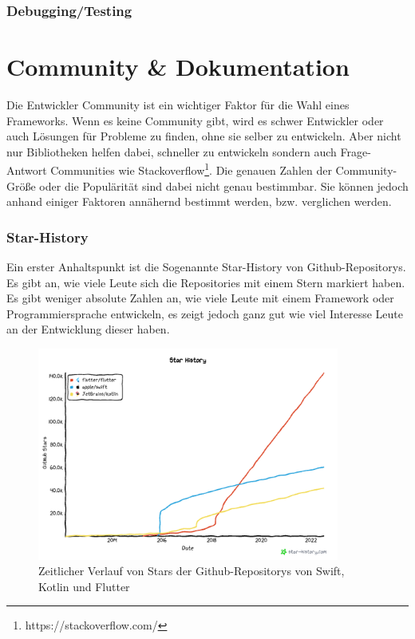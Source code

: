 \subsubsection{Debugging/Testing}

\section{Community \& Dokumentation}
Die Entwickler Community ist ein wichtiger Faktor für die Wahl eines Frameworks. Wenn es keine Community gibt, wird es schwer Entwickler oder auch Lösungen für Probleme zu finden, ohne sie selber zu entwickeln. Aber nicht nur Bibliotheken helfen dabei, schneller zu entwickeln sondern auch Frage-Antwort Communities wie Stackoverflow\footnote{https://stackoverflow.com/}.  Die genauen Zahlen der Community-Größe oder die Populärität sind dabei nicht genau bestimmbar. Sie können jedoch anhand einiger Faktoren annähernd bestimmt werden, bzw. verglichen werden.

\subsubsection{Star-History}
Ein erster Anhaltspunkt ist die Sogenannte Star-History von Github-Repositorys. Es gibt an, wie viele Leute sich die Repositories mit einem Stern markiert haben. Es gibt weniger absolute Zahlen an, wie viele Leute mit einem Framework oder Programmiersprache entwickeln, es zeigt jedoch ganz gut wie viel Interesse Leute an der Entwicklung dieser haben.
\begin{figure}[ht]
  \centering
  \includegraphics[height=7cm,keepaspectratio]{images/star-history_programming languages.png} 
  \caption[Zeitlicher Verlauf von Stars der Github-Repositorys von Swift, Kotlin und Flutter]{Zeitlicher Verlauf von Stars der Github-Repositorys von Swift, Kotlin und Flutter\protect\footnotemark }
  \label{fig:start_history}
\end{figure}




